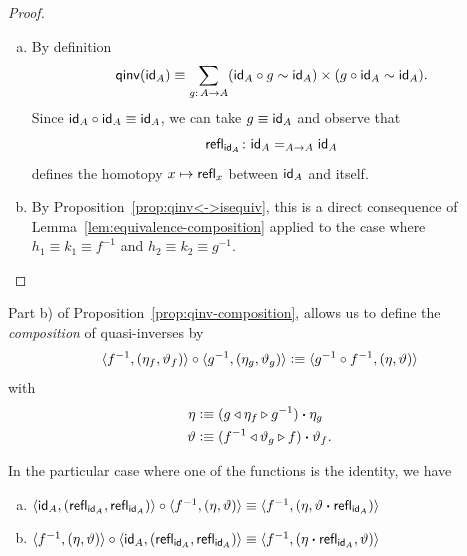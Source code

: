 \begin{proof}${}$
    \begin{enumerate}[a)]
        \item By definition
        \[
            \fun{qinv}(\id_A)\equiv\sum_{g\colon A\to A}
                (\id_A\circ g\sim\id_A)
                \times(g\circ\id_A\sim\id_A).
        \]
        Since $\mathsf{id}_A\circ\mathsf{id}_A\equiv\mathsf{id}_A$, we can take $g\equiv\mathsf{id}_A$ and observe that
        \[
            \fun{refl}_{\id_A}\colon\id_A\eq{A\to A}\id_A
        \]
        defines the homotopy $x\mapsto\mathsf{refl}_x$ between $\mathsf{id}_A$ and itself.

        \item By Proposition~\ref{prop:qinv<->isequiv}, this is a direct consequence of Lemma~\ref{lem:equivalence-composition} applied to the case where $h_1\equiv k_1\equiv f^{-1}$ and $h_2\equiv k_2\equiv g^{-1}$.
    \end{enumerate}    
\end{proof}

\begin{defn}\label{defn:qinv-composition}
    Part b) of Proposition~\ref{prop:qinv-composition}, allows us to define the \textsl{composition} of quasi-inverses by
    \[
        \langle f^{-1},(\eta_f,\vartheta_f)\rangle
            \circ\langle g^{-1},(\eta_g,\vartheta_g)\rangle
            \mathrel{\vcentcolon}\equiv\langle g^{-1}\circ f^{-1},(\eta,\vartheta)\rangle
    \]
    with
    \begin{align*}
        \eta&\mathrel{\vcentcolon}\equiv
            (g\triangleleft\eta_f\triangleright g^{-1})\mathbin{\boldsymbol{\cdot}}\eta_g\\
        \vartheta&\mathrel{\vcentcolon}\equiv
            (f^{-1}\triangleleft\vartheta_g\triangleright f)\mathbin{\boldsymbol{\cdot}}\vartheta_f.
    \end{align*}
\end{defn}

\begin{cor}\label{cor:qinv-composition-with-id}
    In the particular case where one of the functions is the identity, we have
    \begin{enumerate}[a),font=\upshape]
        \item $\langle\mathsf{id}_A,(\mathsf{refl}_{\mathsf{id}_A},\mathsf{refl}_{\mathsf{id}_A})\rangle\circ\langle f^{-1},(\eta,\vartheta)\rangle\equiv\langle f^{-1},(\eta,\vartheta\mathbin{\boldsymbol{\cdot}}\mathsf{refl}_{\mathsf{id}_A})\rangle$

        \item $\langle f^{-1},(\eta,\vartheta)\rangle\circ\langle\mathsf{id}_A,(\mathsf{refl}_{\mathsf{id}_A},\mathsf{refl}_{\mathsf{id}_A})\rangle\equiv\langle f^{-1},(\eta\mathbin{\boldsymbol{\cdot}}\mathsf{refl}_{\mathsf{id}_A},\vartheta)\rangle$
    \end{enumerate}
\end{cor}

